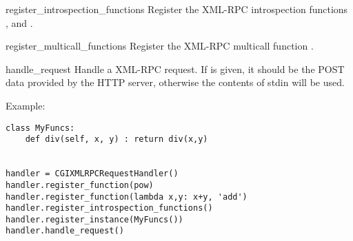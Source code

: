 \begin{methoddesc}{register_introspection_functions}{}
Register the XML-RPC introspection functions 
,  and 
.
\end{methoddesc}

\begin{methoddesc}{register_multicall_functions}{}
Register the XML-RPC multicall function .
\end{methoddesc}

\begin{methoddesc}{handle_request}{}
Handle a XML-RPC request. If  is given, it 
should be the POST data provided by the HTTP server, 
otherwise the contents of stdin will be used.
\end{methoddesc}

Example:

\begin{verbatim}
class MyFuncs:
    def div(self, x, y) : return div(x,y)


handler = CGIXMLRPCRequestHandler()
handler.register_function(pow)
handler.register_function(lambda x,y: x+y, 'add')
handler.register_introspection_functions()
handler.register_instance(MyFuncs())
handler.handle_request()
\end{verbatim}
